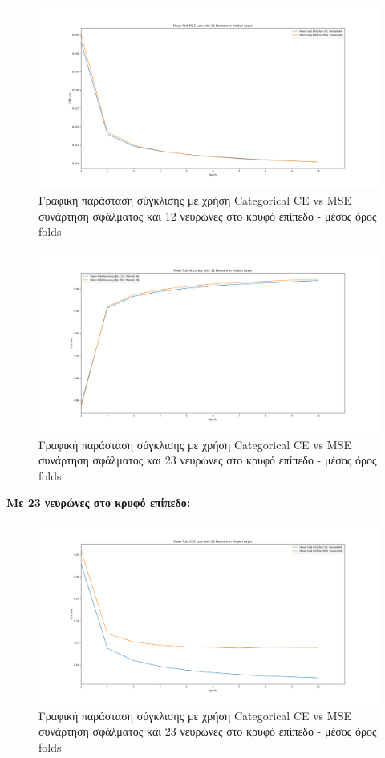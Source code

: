 \documentclass[12pt,a4paper]{article}
\begin{document}
\begin{figure}[H]
	\includegraphics[width=\textwidth]{14. CCE vs MSE - MSE Loss - 12 Neurons - Mean.png}
	\caption{Γραφική παράσταση σύγκλισης με χρήση Categorical CE vs MSE συνάρτηση σφάλματος και 12 νευρώνες στο κρυφό επίπεδο - μέσος όρος folds}
\end{figure}

\begin{figure}[H]
	\includegraphics[width=\textwidth]{15. CCE vs MSE - Accuracy - 12 Neurons - Mean.png}
	\caption{Γραφική παράσταση σύγκλισης με χρήση Categorical CE vs MSE συνάρτηση σφάλματος και 23 νευρώνες στο κρυφό επίπεδο - μέσος όρος folds}
\end{figure}

\textbf{Με 23 νευρώνες στο κρυφό επίπεδο:}

\begin{figure}[H]
	\includegraphics[width=\textwidth]{16. CCE vs MSE - CCE Loss - 23 Neurons - Mean.png}
	\caption{Γραφική παράσταση σύγκλισης με χρήση Categorical CE vs MSE συνάρτηση σφάλματος και 23 νευρώνες στο κρυφό επίπεδο - μέσος όρος folds}
\end{figure}
\end{document}
